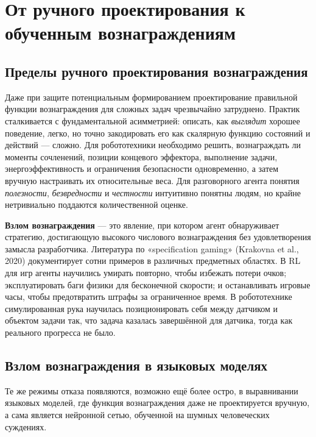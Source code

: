 \section{От ручного проектирования к обученным вознаграждениям}
\label{sec:reward-hacking}

\subsection{Пределы ручного проектирования вознаграждения}

Даже при защите потенциальным формированием проектирование правильной функции вознаграждения для сложных задач чрезвычайно затруднено. Практик сталкивается с фундаментальной асимметрией: описать, как \emph{выглядит} хорошее поведение, легко, но точно закодировать его как скалярную функцию состояний и действий --- сложно. Для робототехники необходимо решить, вознаграждать ли моменты сочленений, позиции концевого эффектора, выполнение задачи, энергоэффективность и ограничения безопасности одновременно, а затем вручную настраивать их относительные веса. Для разговорного агента понятия \emph{полезности}, \emph{безвредности} и \emph{честности} интуитивно понятны людям, но крайне нетривиально поддаются количественной оценке.

\textbf{Взлом вознаграждения} --- это явление, при котором агент обнаруживает стратегию, достигающую высокого числового вознаграждения без удовлетворения замысла разработчика. Литература по «specification gaming» (Krakovna et al., 2020) документирует сотни примеров в различных предметных областях. В RL для игр агенты научились умирать повторно, чтобы избежать потери очков; эксплуатировать баги физики для бесконечной скорости; и останавливать игровые часы, чтобы предотвратить штрафы за ограниченное время. В робототехнике симулированная рука научилась позиционировать себя между датчиком и объектом задачи так, что задача казалась завершённой для датчика, тогда как реального прогресса не было.

\subsection{Взлом вознаграждения в языковых моделях}

Те же режимы отказа появляются, возможно ещё более остро, в выравнивании языковых моделей, где функция вознаграждения даже не проектируется вручную, а сама является нейронной сетью, обученной на шумных человеческих суждениях.

